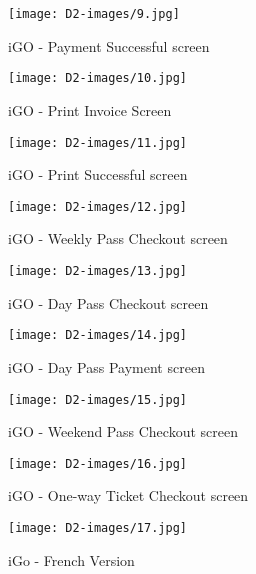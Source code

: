 \documentclass[a4paper,12pt]{report}
\begin{document}
\begin{figure}[h!]
  \centering
   \texttt{[image: D2-images/9.jpg]}
  \caption{iGO - Payment Successful screen}
\end{figure}

\begin{figure}[h!]
  \centering
   \texttt{[image: D2-images/10.jpg]}
  \caption{iGO - Print Invoice Screen}
\end{figure}

\begin{figure}[h!]
  \centering
   \texttt{[image: D2-images/11.jpg]}
  \caption{iGO - Print Successful screen}
\end{figure}

\begin{figure}[h!]
  \centering
   \texttt{[image: D2-images/12.jpg]}
  \caption{iGO - Weekly Pass Checkout screen}
\end{figure}

\begin{figure}[h!]
  \centering
   \texttt{[image: D2-images/13.jpg]}
  \caption{iGO - Day Pass Checkout screen}
\end{figure}

\begin{figure}[h!]
  \centering
   \texttt{[image: D2-images/14.jpg]}
  \caption{iGO - Day Pass Payment screen}
\end{figure}

\begin{figure}[h!]
  \centering
   \texttt{[image: D2-images/15.jpg]}
  \caption{iGO - Weekend Pass Checkout screen}
\end{figure}


\begin{figure}[h!]
  \centering
   \texttt{[image: D2-images/16.jpg]}
  \caption{iGO - One-way Ticket Checkout screen}
\end{figure}

\begin{figure}[h!]
  \centering
   \texttt{[image: D2-images/17.jpg]}
  \caption{iGo - French Version}
\end{figure}
\end{document}

